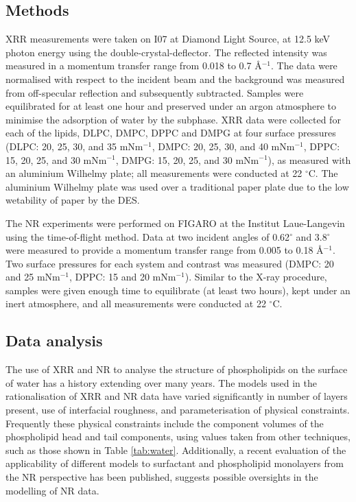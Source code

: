 \documentclass[twoside,twocolumn,9pt]{article}
\begin{document}
\subsection{Methods}
XRR measurements were taken on I07 at Diamond Light Source, at 12.5 keV photon energy using the double-crystal-deflector.\cite{Arnold2012} The reflected intensity was measured in a momentum transfer range from 0.018 to 0.7 \AA$^{-1}$. The data were normalised with respect to the incident beam and the background was measured from off-specular reflection and subsequently subtracted. Samples were equilibrated for at least one hour and preserved under an argon atmosphere to minimise the adsorption of water by the subphase. XRR data were collected for each of the lipids, DLPC, DMPC, DPPC and DMPG at four surface pressures (DLPC: 20, 25, 30, and 35 mNm$^{-1}$, DMPC: 20, 25, 30, and 40 mNm$^{-1}$, DPPC: 15, 20, 25, and 30 mNm$^{-1}$, DMPG: 15, 20, 25, and 30 mNm$^{-1}$), as measured with an aluminium Wilhelmy plate; all measurements were conducted at 22 $^\circ$C. The aluminium Wilhelmy plate was used over a traditional paper plate due to the low wetability of paper by the DES.

The NR experiments were performed on FIGARO at the Institut Laue-Langevin using the time-of-flight method.\cite{Campbell2011} Data at two incident angles of 0.62$^\circ$ and 3.8$^\circ$ were measured to provide a momentum transfer range from 0.005 to 0.18 \AA$^{-1}$. Two surface pressures for each system and contrast was measured (DMPC: 20 and 25 mNm$^{-1}$, DPPC: 15 and 20 mNm$^{-1}$). Similar to the X-ray procedure, samples were given enough time to equilibrate (at least two hours), kept under an inert atmosphere, and all measurements were conducted at 22 $^\circ$C.

\subsection{Data analysis}
The use of XRR and NR to analyse the structure of phospholipids on the surface of water has a history extending over many years.\cite{Mohwald1990,Kewalramani2010,Bayerl1990,Johnson1991,Clifton2012,Helm1987,Daillant1990} The models used in the rationalisation of XRR and NR data have varied significantly in number of layers present, use of interfacial roughness, and parameterisation of physical constraints. Frequently these physical constraints include the component volumes of the phospholipid head and tail components, using values taken from other techniques, such as those shown in Table \ref{tab:water}. Additionally, a recent evaluation of the applicability of different models to surfactant and phospholipid monolayers from the NR perspective has been published,\cite{Campbell2018} suggests possible oversights in the modelling of NR data.
\end{document}
